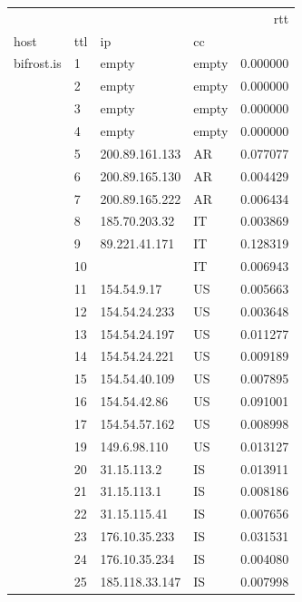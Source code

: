 \begin{center}
\begin{tabular}{llllr}
\toprule
           &    &               &    &       rtt \\
host & ttl & ip & cc &           \\
\midrule
bifrost.is & 1  & empty & empty &  0.000000 \\
           & 2  & empty & empty &  0.000000 \\
           & 3  & empty & empty &  0.000000 \\
           & 4  & empty & empty &  0.000000 \\
           & 5  & 200.89.161.133 & AR &  0.077077 \\
           & 6  & 200.89.165.130 & AR &  0.004429 \\
           & 7  & 200.89.165.222 & AR &  0.006434 \\
           & 8  & 185.70.203.32 & IT &  0.003869 \\
           & 9  & 89.221.41.171 & IT &  0.128319 \\
           & 10 &               & IT &  0.006943 \\
           & 11 & 154.54.9.17 & US &  0.005663 \\
           & 12 & 154.54.24.233 & US &  0.003648 \\
           & 13 & 154.54.24.197 & US &  0.011277 \\
           & 14 & 154.54.24.221 & US &  0.009189 \\
           & 15 & 154.54.40.109 & US &  0.007895 \\
           & 16 & 154.54.42.86 & US &  0.091001 \\
           & 17 & 154.54.57.162 & US &  0.008998 \\
           & 19 & 149.6.98.110 & US &  0.013127 \\
           & 20 & 31.15.113.2 & IS &  0.013911 \\
           & 21 & 31.15.113.1 & IS &  0.008186 \\
           & 22 & 31.15.115.41 & IS &  0.007656 \\
           & 23 & 176.10.35.233 & IS &  0.031531 \\
           & 24 & 176.10.35.234 & IS &  0.004080 \\
           & 25 & 185.118.33.147 & IS &  0.007998 \\
\bottomrule
\end{tabular}

\end{center}

